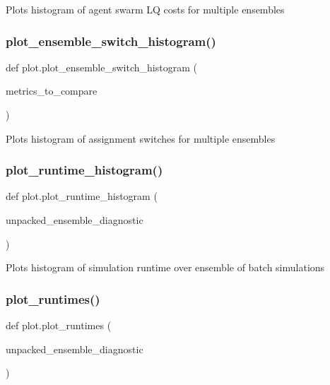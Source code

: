\begin{DoxyVerb}Plots histogram of agent swarm LQ costs for multiple ensembles
\end{DoxyVerb}
 \mbox{\label{namespaceplot_a12a2f66559fa523476ed631c3eb7e30e}} 
\subsubsection{\texorpdfstring{plot\_ensemble\_switch\_histogram()}{plot\_ensemble\_switch\_histogram()}}
{\footnotesize\ttfamily def plot.\+plot\+\_\+ensemble\+\_\+switch\+\_\+histogram (\begin{DoxyParamCaption}\item[{}]{metrics\+\_\+to\+\_\+compare }\end{DoxyParamCaption})}

\begin{DoxyVerb}Plots histogram of assignment switches for multiple ensembles
\end{DoxyVerb}
 \mbox{\label{namespaceplot_a9d05c6f2e6eef461ec8c439e75431cef}} 
\subsubsection{\texorpdfstring{plot\_runtime\_histogram()}{plot\_runtime\_histogram()}}
{\footnotesize\ttfamily def plot.\+plot\+\_\+runtime\+\_\+histogram (\begin{DoxyParamCaption}\item[{}]{unpacked\+\_\+ensemble\+\_\+diagnostic }\end{DoxyParamCaption})}

\begin{DoxyVerb}Plots histogram of simulation runtime over ensemble of batch simulations
\end{DoxyVerb}
 \mbox{\label{namespaceplot_ac876087b1280d54a7321c131b94a51b4}} 
\subsubsection{\texorpdfstring{plot\_runtimes()}{plot\_runtimes()}}
{\footnotesize\ttfamily def plot.\+plot\+\_\+runtimes (\begin{DoxyParamCaption}\item[{}]{unpacked\+\_\+ensemble\+\_\+diagnostic }\end{DoxyParamCaption})}

